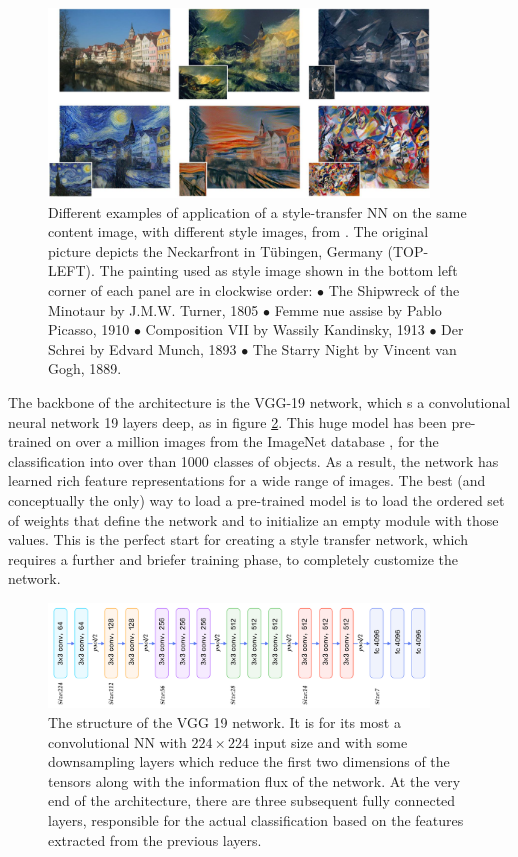 \begin{figure}[b!]
    \centering
    \includegraphics[width = 0.9\textwidth]{images/st_trasf_ex}
    \caption{Different examples of application of a style-transfer NN on the same content image, with different style images, from \cite{1508.06576}. The
original picture depicts the Neckarfront in Tübingen, Germany (TOP-LEFT). The painting used as style image shown in the bottom left corner of each panel are in clockwise order: $\bullet$ The Shipwreck of the Minotaur by J.M.W. Turner, 1805 $\bullet$ Femme nue assise by Pablo Picasso, 1910 $\bullet$ Composition VII by Wassily Kandinsky, 1913 $\bullet$ Der Schrei by Edvard Munch, 1893 $\bullet$ The Starry Night by Vincent van Gogh, 1889.}
    \label{fig:ex_st_tr}
\end{figure}

The backbone of the architecture is the VGG-19 network, which s a convolutional neural network 19 layers deep, as in figure \ref{fig:vgg19}. This huge model has been pre-trained on over a million images from the ImageNet database \cite{imagenet_cvpr09}, for the classification into over than 1000 classes of objects. As a result, the network has learned rich feature representations for a wide range of images. The best (and conceptually the only) way to load a pre-trained model is to load the ordered set of weights that define the network and to initialize an empty module with those values. This is the perfect start for creating a style transfer network, which requires a further and briefer training phase, to completely customize the network.

\begin{figure}
    \centering
    \includegraphics[width = 0.9\textwidth]{images/vgg19_str}
    \caption{The structure of the VGG 19 network. It is for its most a convolutional NN with $224 \times 224$ input size and with some downsampling layers which reduce the first two dimensions of the tensors along with the information flux of the network. At the very end of the architecture, there are three subsequent fully connected layers, responsible for the actual classification based on the features extracted from the previous layers.}
    \label{fig:vgg19}
\end{figure}


